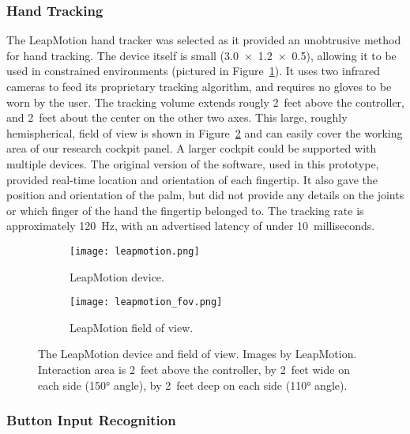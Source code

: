 \subsubsection{Hand Tracking}

The LeapMotion hand tracker was selected as it provided an unobtrusive method for hand tracking.
The device itself is small (\SI{3.0 x 1.2 x 0.5}{\inch}), allowing it to be used in constrained environments (pictured in Figure~\ref{fig:proto_leap_device}).
It uses two infrared cameras to feed its proprietary tracking algorithm, and requires no gloves to be worn by the user.
The tracking volume extends rougly \num{2}~feet above the controller, and \num{2}~feet about the center on the other two axes.
This large, roughly hemispherical, field of view is shown in Figure~\ref{fig:proto_leap_fov} and can easily cover the working area of our research cockpit panel.
A larger cockpit could be supported with multiple devices.
The original version of the software, used in this prototype, provided real-time location and orientation of each fingertip.
It also gave the position and orientation of the palm, but did not provide any details on the joints or which finger of the hand the fingertip belonged to.
The tracking rate is approximately \SI{120}{\hertz}, with an advertised latency of under \num{10}~milliseconds.

\mbox{}\hfill
\begin{figure}
    \centering
    \begin{subfigure}[t]{0.49\linewidth}
        \centering
        \texttt{[image: leapmotion.png]}
        \caption{LeapMotion device.}
        \label{fig:proto_leap_device}
    \end{subfigure}\hfill
    \begin{subfigure}[t]{0.49\linewidth}
        \centering
        \texttt{[image: leapmotion\_fov.png]}
        \caption{LeapMotion field of view.}
        \label{fig:proto_leap_fov}
    \end{subfigure}
    \caption{The LeapMotion device and field of view. Images by LeapMotion. Interaction area is \num{2}~feet above the controller, by \num{2}~feet wide on each side (\ang{150} angle), by \num{2}~feet deep on each side (\ang{110} angle).}
    \label{fig:proto_leap}
\end{figure}
\hfill\mbox{}

\subsubsection{Button Input Recognition}
\label{sec:proto_button_input}

